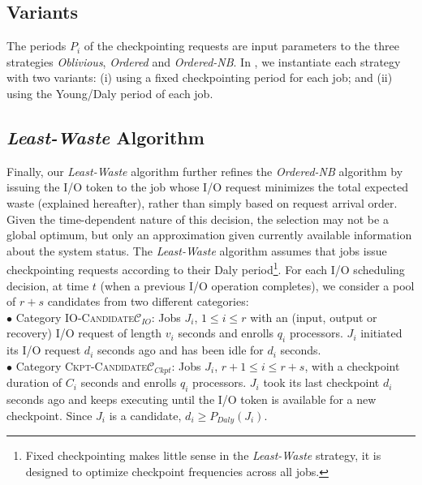 \documentclass[conference,nofonttune]{IEEEtran}
\newcommand{\period}[1]{P_{#1}}
\newcommand{\IOcat}{\textsc{IO-Candidate}\xspace}
\newcommand{\Ckptcat}{\textsc{Ckpt-Candidate}\xspace}
\newcommand{\Catiocat}{\mathcal{C}_{IO}\xspace}
\newcommand{\Catckptcat}{\mathcal{C}_{Ckpt}\xspace}
\newcommand{\nocoop}{\emph{Oblivious}\xspace}
\newcommand{\fifoblock}{\emph{Ordered}\xspace}
\newcommand{\fifononblock}{\emph{Ordered-NB}\xspace}
\newcommand{\leastwaste}{\emph{Least-Waste}\xspace}
\begin{document}
\subsection{Variants}
\label{sec:variants}

The periods $\period{i}$ of the checkpointing requests are input parameters to
the three strategies \nocoop, \fifoblock and \fifononblock. In
, we instantiate each strategy with two variants: (i) using
a fixed checkpointing period for each job; and (ii) using the Young/Daly period of each job.

\subsection{\leastwaste Algorithm}
\label{sec:least-waste}

Finally, our \leastwaste algorithm further refines the \fifononblock algorithm
by issuing the I/O token to the job whose I/O request minimizes the total
expected waste (explained hereafter), rather than simply based on request
arrival order.  Given the time-dependent nature of this decision, the selection
may not be a global optimum, but only an approximation given currently
available information about the system status. The \leastwaste algorithm
assumes that jobs issue checkpointing requests according to their Daly
period\footnote{Fixed checkpointing makes little sense in the \leastwaste strategy,
it is designed to optimize checkpoint frequencies across all jobs.}.  For each
I/O scheduling decision, at time $t$ (when a previous I/O operation completes),
we consider a pool of $r+s$ candidates from two different categories:\\
$\bullet$ Category \IOcat $\Catiocat$: Jobs $J_{i}$, $1\leq i \leq r$ with an
  (input, output or recovery) I/O request of length $v_{i}$ seconds and enrolls $q_{i}$
  processors. $J_{i}$ initiated its I/O request $d_{i}$ seconds ago and has been idle
  for $d_{i}$ seconds.\\
$\bullet$ Category \Ckptcat $\Catckptcat$: Jobs $J_{i}$, $r+1\leq i \leq r+s$,
  with a checkpoint duration of $C_{i}$ seconds and enrolls $q_{i}$ processors.
  $J_{i}$ took its last checkpoint $d_{i}$ seconds ago and keeps executing until the
  I/O token is available for a new checkpoint. Since $J_{i}$ is a candidate,
  $d_{i} \geq \period{Daly}(J_{i})$.
\end{document}
